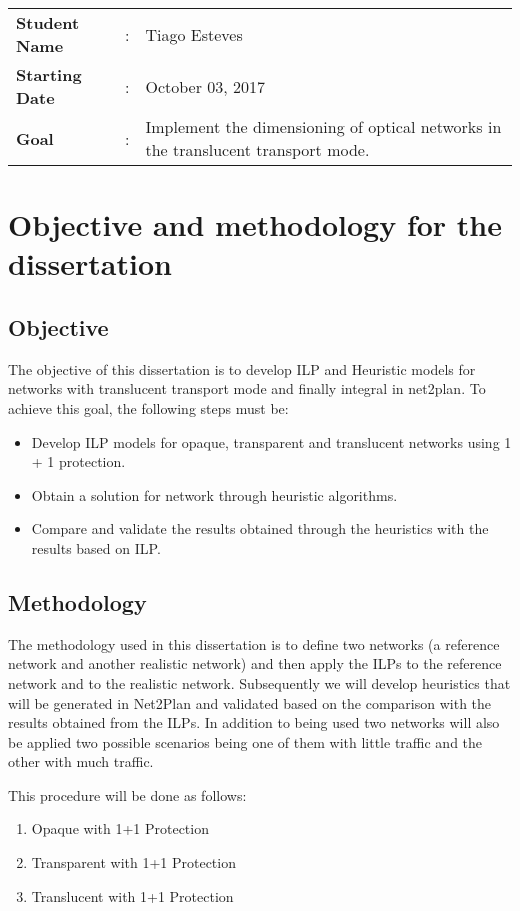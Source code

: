 \clearpage

\begin{tcolorbox}	
\begin{tabular}{p{2.75cm} p{0.2cm} p{10.5cm}} 	
\textbf{Student Name}  &:& Tiago Esteves\\
\textbf{Starting Date} &:& October 03, 2017\\
\textbf{Goal}          &:& Implement the dimensioning of optical networks in the translucent transport mode.
\end{tabular}
\end{tcolorbox}

\section{Objective and methodology for the dissertation}

\subsection{Objective}
The objective of this dissertation is to develop ILP and Heuristic models for networks with translucent transport mode and finally integral in net2plan.
To achieve this goal, the following steps must be:
\begin{itemize}
  \item Develop ILP models for opaque, transparent and translucent networks using 1 + 1 protection.
  \item Obtain a solution for network through heuristic algorithms.
  \item Compare and validate the results obtained through the heuristics with the results based on ILP.
\end{itemize}

\subsection{Methodology}
The methodology used in this dissertation is to define two networks (a reference network and another realistic network) and then apply the ILPs to the reference network and to the realistic network.
Subsequently we will develop heuristics that will be generated in Net2Plan and validated based on the comparison with the results obtained from the ILPs.
In addition to being used two networks will also be applied two possible scenarios being one of them with little traffic and the other with much traffic.

This procedure will be done as follows:
\begin{enumerate}
  \item Opaque with 1+1 Protection
  \item Transparent with 1+1 Protection
  \item Translucent with 1+1 Protection
\end{enumerate}

